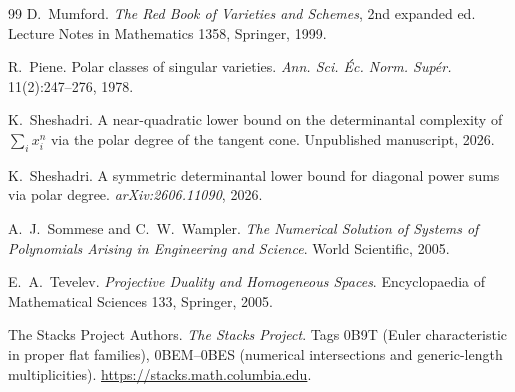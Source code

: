 \documentclass[acmsmall,screen,nonacm]{acmart}
\theoremstyle{definition}
\theoremstyle{remark}
\begin{document}
\begin{thebibliography}{99}
D.~Mumford.
\newblock \emph{The Red Book of Varieties and Schemes}, 2nd expanded
ed.
\newblock Lecture Notes in Mathematics 1358, Springer, 1999.

R.~Piene.
\newblock Polar classes of singular varieties.
\newblock \emph{Ann. Sci. \'Ec. Norm. Sup\'er.} 11(2):247--276, 1978.

K.~Sheshadri.
\newblock A near-quadratic lower bound on the determinantal complexity
of $\sum_i x_i^n$ via the polar degree of the tangent cone.
\newblock Unpublished manuscript, 2026.

K.~Sheshadri.
\newblock A symmetric determinantal lower bound for diagonal power
sums via polar degree.
\newblock \emph{arXiv:2606.11090}, 2026.

A.~J.~Sommese and C.~W.~Wampler.
\newblock \emph{The Numerical Solution of Systems of Polynomials
Arising in Engineering and Science}.
\newblock World Scientific, 2005.

E.~A.~Tevelev.
\newblock \emph{Projective Duality and Homogeneous Spaces}.
\newblock Encyclopaedia of Mathematical Sciences 133, Springer, 2005.

The Stacks Project Authors.
\newblock \emph{The Stacks Project}.
\newblock Tags 0B9T (Euler characteristic in proper flat families),
0BEM--0BES (numerical intersections and generic-length multiplicities).
\newblock \url{https://stacks.math.columbia.edu}.

\end{thebibliography}
\end{document}
